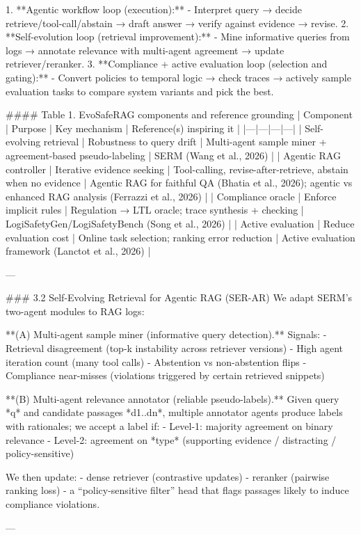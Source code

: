 1. **Agentic workflow loop (execution):**
   - Interpret query → decide retrieve/tool-call/abstain → draft answer → verify against evidence → revise.
2. **Self-evolution loop (retrieval improvement):**
   - Mine informative queries from logs → annotate relevance with multi-agent agreement → update retriever/reranker.
3. **Compliance + active evaluation loop (selection and gating):**
   - Convert policies to temporal logic → check traces → actively sample evaluation tasks to compare system variants and pick the best.

#### Table 1. EvoSafeRAG components and reference grounding
| Component | Purpose | Key mechanism | Reference(s) inspiring it |
|---|---|---|---|
| Self-evolving retrieval | Robustness to query drift | Multi-agent sample miner + agreement-based pseudo-labeling | SERM (Wang et al., 2026) |
| Agentic RAG controller | Iterative evidence seeking | Tool-calling, revise-after-retrieve, abstain when no evidence | Agentic RAG for faithful QA (Bhatia et al., 2026); agentic vs enhanced RAG analysis (Ferrazzi et al., 2026) |
| Compliance oracle | Enforce implicit rules | Regulation → LTL oracle; trace synthesis + checking | LogiSafetyGen/LogiSafetyBench (Song et al., 2026) |
| Active evaluation | Reduce evaluation cost | Online task selection; ranking error reduction | Active evaluation framework (Lanctot et al., 2026) |

---

### 3.2 Self-Evolving Retrieval for Agentic RAG (SER-AR)
We adapt SERM’s two-agent modules to RAG logs:

**(A) Multi-agent sample miner (informative query detection).**
Signals:
- Retrieval disagreement (top-k instability across retriever versions)
- High agent iteration count (many tool calls)
- Abstention vs non-abstention flips
- Compliance near-misses (violations triggered by certain retrieved snippets)

**(B) Multi-agent relevance annotator (reliable pseudo-labels).**
Given query *q* and candidate passages *d1..dn*, multiple annotator agents produce labels with rationales; we accept a label if:
- Level-1: majority agreement on binary relevance
- Level-2: agreement on *type* (supporting evidence / distracting / policy-sensitive)

We then update:
- dense retriever (contrastive updates)
- reranker (pairwise ranking loss)
- a “policy-sensitive filter” head that flags passages likely to induce compliance violations.

---

